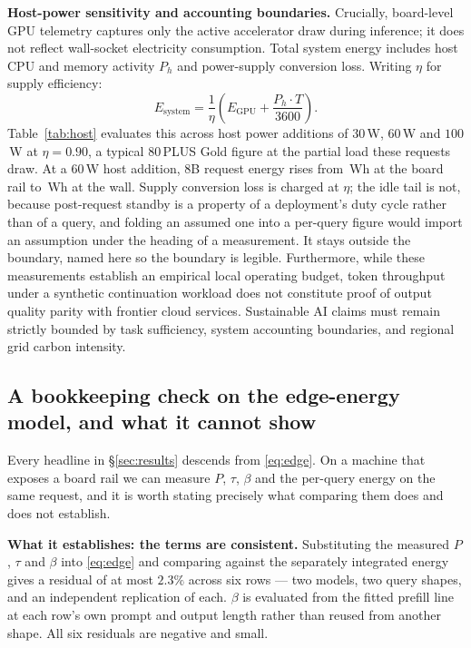 \documentclass[conference]{IEEEtran}
\begin{document}
\textbf{Host-power sensitivity and accounting boundaries.}
Crucially, board-level GPU telemetry captures only the active accelerator draw
during inference; it does not reflect wall-socket electricity consumption. Total
system energy includes host CPU and memory activity $P_h$ and power-supply
conversion loss. Writing $\eta$ for supply efficiency:
\begin{equation}
E_{\text{system}} = \frac{1}{\eta}\left(E_{\text{GPU}} + \frac{P_h \cdot T}{3600}\right).
\label{eq:system}
\end{equation}
Table~\ref{tab:host} evaluates this across host power additions of $30$\,W,
$60$\,W and $100$\,W at $\eta = 0.90$, a typical 80\,PLUS Gold figure at the
partial load these requests draw. At a $60$\,W host addition, 8B request energy
rises from \RtxEightHostZero{}\,Wh at the board rail to
\RtxEightHostSixty{}\,Wh at the wall. Supply conversion loss is charged at
$\eta$; the idle tail is not, because post-request
standby is a property of a deployment's duty cycle rather than of a query, and
folding an assumed one into a per-query figure would import an assumption under
the heading of a measurement. It stays outside the boundary, named here so the
boundary is legible.
Furthermore, while these measurements establish an empirical local operating
budget, token throughput under a synthetic continuation workload does not
constitute proof of output quality parity with frontier cloud services.
Sustainable AI claims must remain strictly bounded by task sufficiency, system
accounting boundaries, and regional grid carbon intensity.

\subsection{A bookkeeping check on the edge-energy model, and what it cannot show}
\label{sec:formcheck}
Every headline in \S\ref{sec:results} descends from \eqref{eq:edge}. On a
machine that exposes a board rail we can measure $P$, $\tau$, $\beta$ and the
per-query energy on the same request, and it is worth stating precisely what
comparing them does and does not establish.

\textbf{What it establishes: the terms are consistent.} Substituting the
measured $P$, $\tau$ and $\beta$ into \eqref{eq:edge} and comparing against the
separately integrated energy gives a residual of at most $\mathbf{2.3\%}$ across
six rows --- two models, two query shapes, and an independent replication of
each. $\beta$ is evaluated from the fitted prefill line at each row's own prompt
and output length rather than reused from another shape. All six residuals are
negative and small.
\end{document}
